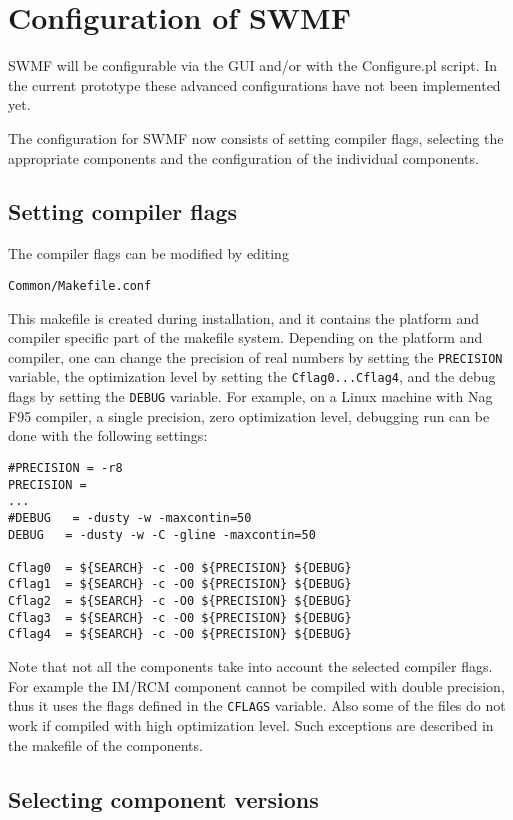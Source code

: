\section{Configuration of SWMF}

SWMF will be configurable via the GUI and/or with the Configure.pl script.
In the current prototype these advanced configurations have not been 
implemented yet.

The configuration for SWMF now consists of setting compiler flags,
selecting the appropriate components and the configuration
of the individual components.

\subsection{Setting compiler flags}

The compiler flags can be modified by editing
\begin{verbatim}
Common/Makefile.conf
\end{verbatim}
This makefile is created during installation, and it contains the
platform and compiler specific part of the makefile system.
Depending on the platform and compiler, one can change the
precision of real numbers by setting the {\tt PRECISION} variable,
the optimization level by setting the {\tt Cflag0...Cflag4},
and the debug flags by setting the {\tt DEBUG} variable.
For example, on a Linux machine with Nag F95 compiler, a single
precision, zero optimization level, debugging run can be done
with the following settings:
\begin{verbatim}
#PRECISION = -r8
PRECISION =
...
#DEBUG   = -dusty -w -maxcontin=50
DEBUG   = -dusty -w -C -gline -maxcontin=50

Cflag0  = ${SEARCH} -c -O0 ${PRECISION} ${DEBUG}
Cflag1  = ${SEARCH} -c -O0 ${PRECISION} ${DEBUG}
Cflag2  = ${SEARCH} -c -O0 ${PRECISION} ${DEBUG}
Cflag3  = ${SEARCH} -c -O0 ${PRECISION} ${DEBUG}
Cflag4  = ${SEARCH} -c -O0 ${PRECISION} ${DEBUG}
\end{verbatim}
Note that not all the components take into account the selected
compiler flags. For example the IM/RCM component cannot be 
compiled with double precision, thus it uses the flags
defined in the {\tt CFLAGS} variable. Also some of the files
do not work if compiled with high optimization level.
Such exceptions are described in the makefile of the 
components.

\subsection{Selecting component versions}

